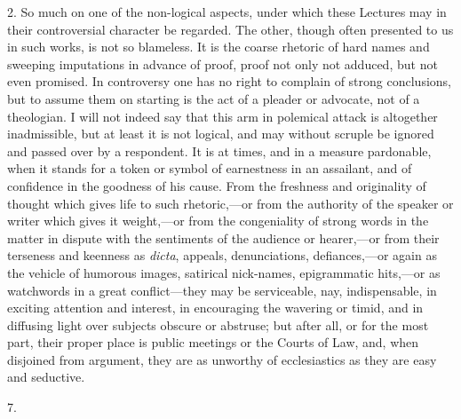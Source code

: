 2. So much on one of the non-logical aspects, under which these
Lectures may in their controversial character be regarded. The other,
though often presented to us in such works, is not so blameless. It is
the coarse rhetoric of hard names and sweeping imputations in advance
of proof, proof not only not adduced, but not even promised. In
controversy one has no right to complain of strong conclusions, but to
assume them on starting is the act of a pleader or advocate, not of a
theologian. I will not indeed say that this arm in polemical attack is
altogether inadmissible, but at least it is not logical, and may
without scruple be ignored and passed over by a respondent. It is at
times, and in a measure pardonable, when it stands for a token or
symbol of earnestness in an assailant, and of confidence in the
goodness of his cause. From the freshness and originality of thought
which gives life to such rhetoric,—or from the authority of the
speaker or writer which gives it weight,—or from the congeniality of
strong words in the matter in dispute with the sentiments of the
audience or hearer,—or from their terseness and keenness as \emph{dicta},
appeals, denunciations, defiances,—or again as the vehicle of
humorous images, satirical nick-names, epigrammatic hits,—or
as watchwords in a great conflict—they may be serviceable, nay,
indispensable, in exciting attention and interest, in encouraging the
wavering or timid, and in diffusing light over subjects obscure or
abstruse; but after all, or for the most part, their proper place is
public meetings or the Courts of Law, and, when disjoined from
argument, they are as unworthy of ecclesiastics as they are easy and
seductive.

7.

